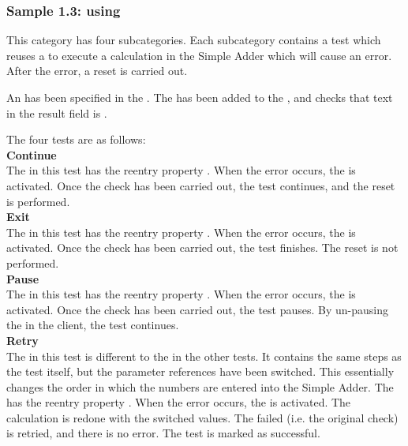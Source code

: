 \subsubsection{Sample 1.3: using \gdehandlers{}}

This category has four subcategories. Each subcategory contains a test which reuses a \gdcase{} to execute a calculation in the Simple Adder which will cause an error. After the error, a reset is carried out. 

An \gdehandler{} has been specified in the  \gdproject{}. The \gdehandler{} has been added to the \gdcase{}, and checks that text in the result field is . 

The four tests are as follows:\\

\textbf{Continue}\\
The \gdehandler{} in this test has the reentry property . When the error occurs, the \gdehandler{} is activated. Once the check has been carried out, the test continues, and the reset is performed. \\
\textbf{Exit}\\
The \gdehandler{} in this test has the reentry property . When the error occurs, the \gdehandler{} is activated. Once the check has been carried out, the test finishes. The reset is not performed.  \\
\textbf{Pause}\\
The \gdehandler{} in this test has the reentry property . When the error occurs, the \gdehandler{} is activated. Once the check has been carried out, the test pauses. By un-pausing the \gdsuite{} in the client, the test continues.   \\
\textbf{Retry}\\
The \gdehandler{} in this test is different to the \gdehandler{} in the other tests. It contains the same steps as the test itself, but the parameter references have been switched. This essentially changes the order in which the numbers are entered into the Simple Adder. The \gdehandler{} has the reentry property . When the error occurs, the \gdehandler{} is activated. The calculation is redone with the switched values. The failed \gdstep{} (i.e. the original check) is retried, and there is no error. The test is marked as successful.  \\

